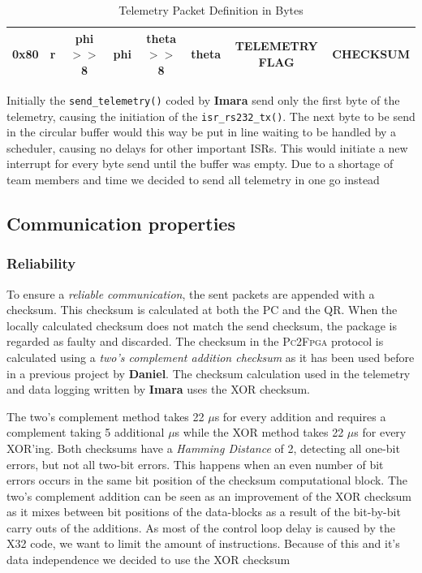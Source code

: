 \documentclass{article}
\begin{document}
\begin{table}[ht]
\centering
\begin{tabular}{|c|c|c|c|c|c|c|c|}
\hline 
0x80 & r & phi $>>$ 8 & phi & theta $>>$ 8 & theta & TELEMETRY FLAG & CHECKSUM \\
\hline 
\end{tabular} 
\caption{Telemetry Packet Definition in Bytes}
\label{tbl:TelPkgDefinition}
\end{table}


Initially the \texttt{send\_telemetry()} coded by \textbf{Imara} send only the first byte of the telemetry, causing the initiation of the \texttt{isr\_rs232\_tx()}. The next byte to be send in the circular buffer would this way be put in line waiting to be handled by a scheduler, causing no delays for other important ISRs. This would initiate a new interrupt for every byte send until the buffer was empty. Due to a shortage of team members and time we decided to send all telemetry in one go instead

% 

\subsection{Communication properties}
\subsubsection{Reliability} 
To ensure a \emph{reliable communication}, the sent packets are appended with a checksum.  This checksum is calculated at both the PC and the QR. When the locally calculated checksum does not match the send checksum, the package is regarded as faulty and discarded. The checksum in the \textsc{Pc2Fpga} protocol is calculated using a \emph{two's complement addition checksum} as it has been used before in a previous project by \textbf{Daniel}. The checksum calculation used in the telemetry and data logging written by \textbf{Imara} uses the \textsc{XOR} checksum.  

The two's complement method takes 22 $\mu$s for every addition and requires a complement taking 5 additional $\mu$s while the \textsc{XOR} method takes 22 $\mu$s for every \textsc{XOR}'ing. Both checksums have a \emph{Hamming Distance} of 2, detecting all one-bit errors, but not all two-bit errors. This happens when an even number of bit errors occurs in the same bit position of the checksum computational block. The two's complement addition can be seen as an improvement of the \textsc{XOR} checksum as it mixes between bit positions of the data-blocks as a result of the bit-by-bit carry outs of the additions. As most of the control loop delay is caused by the X32 code, we want to limit the amount of instructions. Because of this and it's data independence we decided to use the \textsc{XOR} checksum 
\end{document}
